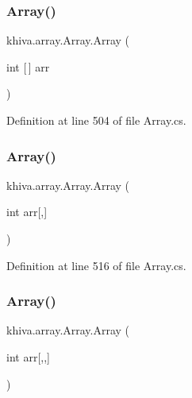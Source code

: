 \subsubsection{\texorpdfstring{Array()}{Array()}\hspace{0.1cm}{\footnotesize\ttfamily [17/46]}}
{\footnotesize\ttfamily khiva.\+array.\+Array.\+Array (\begin{DoxyParamCaption}\item[{int \mbox{[}$\,$\mbox{]}}]{arr }\end{DoxyParamCaption})\hspace{0.3cm}{\ttfamily [inline]}}



Definition at line 504 of file Array.\+cs.

\mbox{\label{classkhiva_1_1array_1_1_array_a4bbdc82396e41f050480eed78310e8d7}} 
\subsubsection{\texorpdfstring{Array()}{Array()}\hspace{0.1cm}{\footnotesize\ttfamily [18/46]}}
{\footnotesize\ttfamily khiva.\+array.\+Array.\+Array (\begin{DoxyParamCaption}\item[{int}]{arr\mbox{[},\mbox{]} }\end{DoxyParamCaption})\hspace{0.3cm}{\ttfamily [inline]}}



Definition at line 516 of file Array.\+cs.

\mbox{\label{classkhiva_1_1array_1_1_array_a3540ff2ae5e84a60983416861feb382c}} 
\subsubsection{\texorpdfstring{Array()}{Array()}\hspace{0.1cm}{\footnotesize\ttfamily [19/46]}}
{\footnotesize\ttfamily khiva.\+array.\+Array.\+Array (\begin{DoxyParamCaption}\item[{int}]{arr\mbox{[},,\mbox{]} }\end{DoxyParamCaption})\hspace{0.3cm}{\ttfamily [inline]}}



